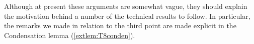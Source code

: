\documentclass[UKenglish,cleveref,DIV=12]{scrartcl}
\let\forall\forallAlt
\theoremstyle{definition}
\theoremstyle{definition}
\begin{document}

Although at present these arguments are somewhat vague, they should explain the
motivation behind a number of the technical results to follow. In particular,
the remarks we made in relation to the third point are made explicit in the
Condensation lemma (\cref{extlem:T8conden}).
\end{document}
